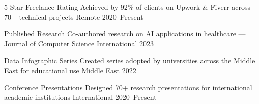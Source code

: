 



\begin{cvhonors}

  \cvhonor
    {5-Star Freelance Rating}
    {Achieved by 92\% of clients on Upwork \& Fiverr across 70+ technical projects}
    {Remote}
    {2020--Present}

  \cvhonor
    {Published Research}
    {Co-authored research on AI applications in healthcare — Journal of Computer Science}
    {International}
    {2023}

  \cvhonor
    {Data Infographic Series}
    {Created series adopted by universities across the Middle East for educational use}
    {Middle East}
    {2022}

  \cvhonor
    {Conference Presentations}
    {Designed 70+ research presentations for international academic institutions}
    {International}
    {2020--Present}

\end{cvhonors}




